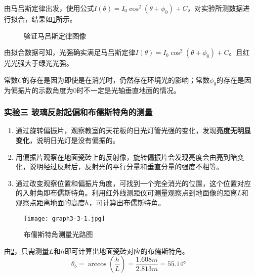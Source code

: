 \documentclass[dvipsnames, svgnames,a4paper,11pt]{article}
\begin{document}
	由马吕斯定律出发，使用公式$I(\theta)=I_0\cos^2(\theta+\phi_0)+C$，对实验所测数据进行拟合，结果如\cref{fig:graph3-2}所示。

	\begin{figure}[htbp]
		\centering
		\quad
		\quad
		\quad

		\caption{验证马吕斯定律图像}
		\label{fig:graph3-2}
		
	\end{figure}

	由拟合数据可知，光强确实满足马吕斯定律$I(\theta)=I_0\cos^2(\theta+\phi_0)+C$。且红光光强大于绿光光强。
	
	常数$C$的存在是因为即使是在消光时，仍然存在环境光的影响；常数$\phi_0$的存在是因为偏振片的示数角度为0时不一定是光轴垂直地面的情况。
			



	\subsubsection{实验三 \quad 玻璃反射起偏和布儒斯特角的测量}

	\begin{enumerate}
		\item 通过旋转偏振片，观察教室的天花板的日光灯管光强的变化，发现\textbf{亮度无明显变化}，说明日光灯是没有偏振的。
		\item 用偏振片观察在地面瓷砖上的反射像，旋转偏振片会发现亮度会由亮到暗变化，说明经过反射后，反射光的平行分量和垂直分量的强度不相等。
		\item 通过改变观察位置和偏振片角度，可找到一个完全消光的位置，这个位置对应的入射角即布儒斯特角。利用红外线测距仪可测量观察点到地面像的距离$L$和观察点距离地面的高度$h$，可计算出布儒斯特角。
	\end{enumerate}
	


	\begin{figure}[htbp]
		\centering
		\texttt{[image: graph3-3-1.jpg]}
		\caption{布儒斯特角测量光路图}
		\label{fig:graph3-3-1}
	\end{figure}

	由\cref{fig:graph3-3-1}，只需测量$L$和$h$即可计算出地面瓷砖对应的布儒斯特角。
	\[
	\theta_b=\arccos(\frac{h}{L})=\frac{1.608m}{2.813m}=\ang{55.14}	
	\]
	
\end{document}
